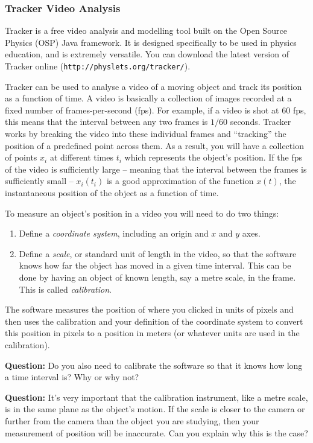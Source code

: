 \subsubsection*{Tracker Video Analysis}

Tracker is a free video analysis and modelling tool built on the Open Source Physics (OSP) Java framework. It is designed specifically to be used in physics education, and is extremely versatile. You can download the latest version of Tracker online (\nolinkurl{http://physlets.org/tracker/}).

Tracker can be used to analyse a video of a moving object and track its position as a function of time. A video is basically a collection of images recorded at a fixed number of frames-per-second (fps). For example, if a video is shot at $60$ fps, this means that the interval between any two frames is $1/60$ seconds. Tracker works by breaking the video into these individual frames and ``tracking'' the position of a predefined point across them. As a result, you will have a collection of points $x_i$ at different times $t_i$ which represents the object's position. If the fps of the video is sufficiently large -- meaning that the interval between the frames is sufficiently small -- $x_i(t_i)$ is a good approximation of the function $x(t)$, the instantaneous position of the object as a function of time.

To measure an object's position in a video you will need to do two things:
\vspace{-\parskip}
\begin{enumerate}
    \item Define a \textsl{coordinate system}, including an origin and $x$ and $y$ axes.
    \item Define a \textsl{scale}, or standard unit of length in the video, so that the software knows how far the object has moved in a given time interval. This can be done by having an object of known length, say a metre scale, in the frame. This is called \textsl{calibration}.
\end{enumerate}


The software measures the position of where you clicked in units of pixels and then uses the calibration and your definition of the coordinate system to convert this position in pixels to a position in meters (or whatever units are used in the calibration).


\begin{question}
\textbf{Question:} Do you also need to calibrate the software so that it knows how long a time interval is? Why or why not?

\textbf{Question:} It’s very important that the calibration instrument, like a metre scale, is in the same plane as the object’s motion. If the scale is closer to the camera or further from the camera than the object you are studying, then your measurement of position will be inaccurate. Can you explain why this is the case?
\end{question}

